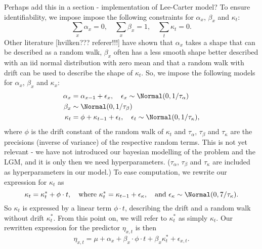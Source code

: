 \textcolor{myDarkGreen}{
Perhaps add this in a section - implementation of Lee-Carter model?
}
To ensure identifiability, we impose impose the following constraints for $\alpha_x$, $\beta_x$ and $\kappa_t$:
\begin{equation}
    \sum_x \alpha_x = 0, \quad \sum_x\beta_x = 1, \quad \sum_t\kappa_t = 0.
    \label{eq:LC-constraints}    
\end{equation}
\newline
Other literature [hvilken??? referer!!!] have shown that $\alpha_x$ takes a shape that can be described as a random walk, $\beta_x$ often has a less smooth shape better described with an iid normal distribution with zero mean and that a random walk with drift can be used to describe the shape of $\kappa_t$. So, we impose the following models for $\alpha_x$, $\beta_x$ and $\kappa_x$:
\begin{equation}
    \begin{aligned}
    \alpha_x &= \alpha_{x-1} + \epsilon_{x}, \quad \epsilon_x \sim \Normal(0,1/\tau_{\alpha}) \\
    \beta_x &\sim \Normal(0, 1/\tau_{\beta}) \\
    \kappa_t &= \phi + \kappa_{t-1} + \epsilon_t, \quad \epsilon_t\sim \Normal(0, 1/\tau_\kappa),
    \end{aligned}
    \label{eq:LCrandomEffects}
\end{equation}
where $\phi$ is the drift constant of the random walk of $\kappa_t$ and $\tau_\alpha$, $\tau_\beta$ and $\tau_\kappa$ are the precisions (inverse of variance) of the respective random terms.
\textcolor{myDarkGreen}{This is not yet relevant - we have not introduced our bayesian modelling of the problem and the LGM, and it is only then we need hyperparameters. }
($\tau_\alpha$, $\tau_\beta$ and $\tau_\kappa$ are included as hyperparameters in our model.)
To ease computation, we rewrite our expression for $\kappa_t$ as
\begin{equation}
    \kappa_t = \kappa_{t}^* + \phi\cdot t, \quad \text{where } \kappa_t^*=\kappa_{t-1} + \epsilon_\kappa, \quad\text{and }\epsilon_\kappa\sim\Normal(0, 7/\tau_\kappa).
    \label{eq:DriftlessKappa}
\end{equation}
So $\kappa_t$ is expressed by a linear term $\phi \cdot t$, describing the drift and a random walk without drift $\kappa_t^*$. From this point on, we will refer to $\kappa_t^*$ as simply $\kappa_t$. Our rewritten expression for the predictor $\eta_{x,t}$ is then
\begin{equation}
\eta_{x,t} = \mu + \alpha_x + \beta_x\cdot\phi\cdot t + \beta_x\kappa_t^* + \epsilon_{x,t}.
\end{equation}
